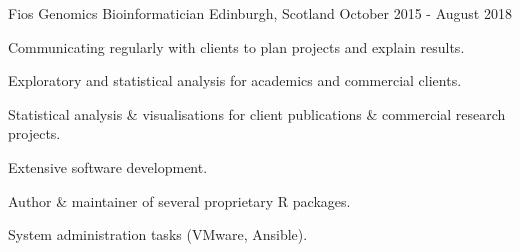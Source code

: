 


\begin{cventries}
\cventry
{Fios Genomics} %
{Bioinformatician} %
{Edinburgh, Scotland} %
{October 2015 - August 2018} %
{ %
    \begin{cvitems}
        \item {
            Communicating regularly with clients to plan projects and explain 
            results.
        }
        \item {
            Exploratory and statistical analysis for academics and commercial 
            clients.
        }
        \item {
            Statistical analysis \& visualisations for client publications \& 
            commercial research projects.
        }
        \item {Extensive software development.}
        \item {Author \& maintainer of several proprietary R packages.}
        \item {System administration tasks (VMware, Ansible).}
    \end{cvitems}
}

\end{cventries}

